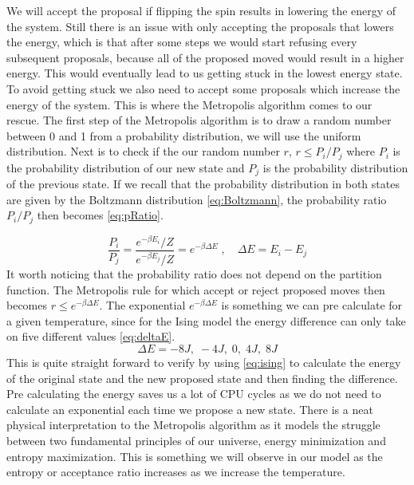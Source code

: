We will
accept the proposal if flipping the spin results in lowering the energy of the
system. Still there is an issue with only accepting the proposals that lowers
the energy, which is that after some steps we would start refusing every
subsequent proposals, because all of the proposed moved would result in a higher
energy. This would eventually lead to us getting stuck in the lowest energy
state. To avoid getting stuck we also need to accept some proposals which
increase the energy of the system. This is where the Metropolis
algorithm comes to our rescue. The first step of the Metropolis algorithm is to
draw a random number between 0 and 1 from a probability distribution, we will
use the uniform distribution. Next is to check if the our random number $r$,  $r \leq P_i
/P_j$ where $P_i$ is the probability distribution of our new state and $P_j$ is
the probability distribution of the previous state. If we recall that the
probability distribution in both states are given by the Boltzmann distribution
\cref{eq:Boltzmann}, the probability ratio $P_i/P_j$ then becomes \cref{eq:pRatio}.

\begin{equation}\label{eq:pRatio}
  \frac{P_i}{P_j} = \frac{e^{-\beta E_i}/Z}{e^{-\beta E_j}/Z} = e^{-\beta \Delta E} \; , \quad \Delta E = E_i - E_j
\end{equation}
It worth noticing that the probability ratio does not depend on the partition
function. The Metropolis rule for which accept or reject proposed moves then
becomes $r \leq e^{-\beta \Delta E}$. The exponential $e^{-\beta \Delta E}$ is
something we can
pre calculate for a given temperature, since for the Ising
model the energy difference can only take on five different values \cref{eq:deltaE}.
\begin{equation}\label{eq:deltaE}
  \Delta E = -8J, \; -4J, \; 0, \; 4J, \; 8J
\end{equation}
This is quite straight forward to verify by using \cref{eq:ising} to calculate
the energy of the original state and the new proposed
state and then finding the difference. Pre calculating the energy saves us a lot
of CPU cycles as we do not need to calculate an exponential each time we propose
a new state. There is a neat physical interpretation to the Metropolis
algorithm as it models the struggle between two fundamental principles of our
universe, energy minimization and entropy maximization. This is something we
will observe in our model as the entropy or acceptance ratio increases as we
increase the temperature.


